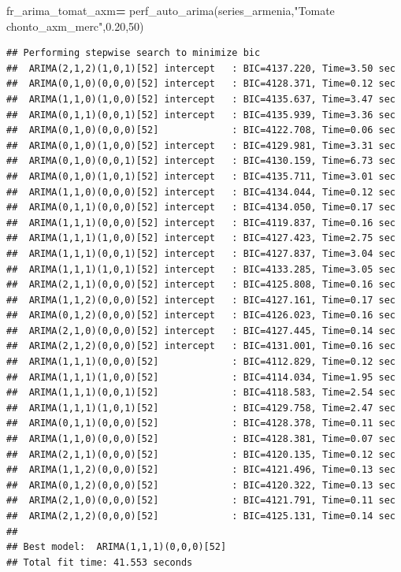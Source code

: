 \documentclass[
]{book}
\newenvironment{Shaded}{\begin{snugshade}}{\end{snugshade}}
\newcommand{\DecValTok}[1]{\textcolor[rgb]{0.00,0.00,0.81}{#1}}
\newcommand{\FloatTok}[1]{\textcolor[rgb]{0.00,0.00,0.81}{#1}}
\newcommand{\NormalTok}[1]{#1}
\newcommand{\OperatorTok}[1]{\textcolor[rgb]{0.81,0.36,0.00}{\textbf{#1}}}
\newcommand{\StringTok}[1]{\textcolor[rgb]{0.31,0.60,0.02}{#1}}
\begin{document}
\begin{Shaded}
\begin{Highlighting}[]

\NormalTok{fr\_arima\_tomat\_axm}\OperatorTok{=}\NormalTok{ perf\_auto\_arima(series\_armenia,}\StringTok{"Tomate chonto\_axm\_merc"}\NormalTok{,}\FloatTok{0.20}\NormalTok{,}\DecValTok{50}\NormalTok{)}
\end{Highlighting}
\end{Shaded}

\begin{verbatim}
## Performing stepwise search to minimize bic
##  ARIMA(2,1,2)(1,0,1)[52] intercept   : BIC=4137.220, Time=3.50 sec
##  ARIMA(0,1,0)(0,0,0)[52] intercept   : BIC=4128.371, Time=0.12 sec
##  ARIMA(1,1,0)(1,0,0)[52] intercept   : BIC=4135.637, Time=3.47 sec
##  ARIMA(0,1,1)(0,0,1)[52] intercept   : BIC=4135.939, Time=3.36 sec
##  ARIMA(0,1,0)(0,0,0)[52]             : BIC=4122.708, Time=0.06 sec
##  ARIMA(0,1,0)(1,0,0)[52] intercept   : BIC=4129.981, Time=3.31 sec
##  ARIMA(0,1,0)(0,0,1)[52] intercept   : BIC=4130.159, Time=6.73 sec
##  ARIMA(0,1,0)(1,0,1)[52] intercept   : BIC=4135.711, Time=3.01 sec
##  ARIMA(1,1,0)(0,0,0)[52] intercept   : BIC=4134.044, Time=0.12 sec
##  ARIMA(0,1,1)(0,0,0)[52] intercept   : BIC=4134.050, Time=0.17 sec
##  ARIMA(1,1,1)(0,0,0)[52] intercept   : BIC=4119.837, Time=0.16 sec
##  ARIMA(1,1,1)(1,0,0)[52] intercept   : BIC=4127.423, Time=2.75 sec
##  ARIMA(1,1,1)(0,0,1)[52] intercept   : BIC=4127.837, Time=3.04 sec
##  ARIMA(1,1,1)(1,0,1)[52] intercept   : BIC=4133.285, Time=3.05 sec
##  ARIMA(2,1,1)(0,0,0)[52] intercept   : BIC=4125.808, Time=0.16 sec
##  ARIMA(1,1,2)(0,0,0)[52] intercept   : BIC=4127.161, Time=0.17 sec
##  ARIMA(0,1,2)(0,0,0)[52] intercept   : BIC=4126.023, Time=0.16 sec
##  ARIMA(2,1,0)(0,0,0)[52] intercept   : BIC=4127.445, Time=0.14 sec
##  ARIMA(2,1,2)(0,0,0)[52] intercept   : BIC=4131.001, Time=0.16 sec
##  ARIMA(1,1,1)(0,0,0)[52]             : BIC=4112.829, Time=0.12 sec
##  ARIMA(1,1,1)(1,0,0)[52]             : BIC=4114.034, Time=1.95 sec
##  ARIMA(1,1,1)(0,0,1)[52]             : BIC=4118.583, Time=2.54 sec
##  ARIMA(1,1,1)(1,0,1)[52]             : BIC=4129.758, Time=2.47 sec
##  ARIMA(0,1,1)(0,0,0)[52]             : BIC=4128.378, Time=0.11 sec
##  ARIMA(1,1,0)(0,0,0)[52]             : BIC=4128.381, Time=0.07 sec
##  ARIMA(2,1,1)(0,0,0)[52]             : BIC=4120.135, Time=0.12 sec
##  ARIMA(1,1,2)(0,0,0)[52]             : BIC=4121.496, Time=0.13 sec
##  ARIMA(0,1,2)(0,0,0)[52]             : BIC=4120.322, Time=0.13 sec
##  ARIMA(2,1,0)(0,0,0)[52]             : BIC=4121.791, Time=0.11 sec
##  ARIMA(2,1,2)(0,0,0)[52]             : BIC=4125.131, Time=0.14 sec
## 
## Best model:  ARIMA(1,1,1)(0,0,0)[52]          
## Total fit time: 41.553 seconds
\end{verbatim}
\end{document}
